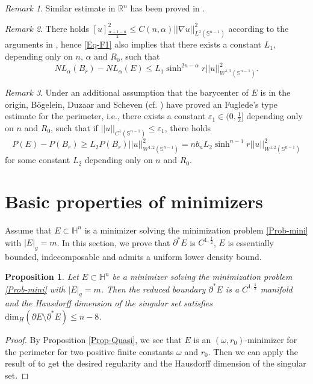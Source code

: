 \documentclass[11pt,reqno]{amsart}
\newtheorem{prop}[thm]{Proposition}
\theoremstyle{definition}
\theoremstyle{remark}
\newtheorem{rem}{Remark}
\numberwithin{equation}{section}
\renewcommand{\(}{\left(}
\renewcommand{\)}{\right)}
\renewcommand{\-}{\overline}
\begin{document}
\begin{rem}
	Similar estimate in $\mathbb{R}^n$ has been proved in \cite[Lemma 5.3]{Figalli15}.
\end{rem}
\begin{rem}\label{Rem-R1}
	There holds $[u]^2_{\frac{\alpha+1-n}{2}}\leq C(n,\alpha) ||\nabla u||^2_{L^2(\mathbb{S}^{n-1})}$ according to the arguments in \cite[Pages 486-490]{Figalli15}, hence \eqref{Eq-F1} also implies that there exists a constant $L_1$, depending only on $n$, $\alpha$ and $R_0$, such that
	\begin{equation}\label{Eq-F2}
			NL_{\alpha}(B_r)-NL_{\alpha}(E)\leq L_1 \sinh^{2n-\alpha} r||u||^2_{W^{1,2}(\mathbb{S}^{n-1})}.
	\end{equation}
\end{rem}
\begin{rem}\label{Rem-Fuglede}
	Under an additional assumption that the barycenter of $E$ is in the origin, Bögelein, Duzaar and Scheven (cf. \cite[Theorem 4.1]{Bogelein15}) have proved an Fuglede's type estimate for the perimeter, i.e., there exists a constant $\varepsilon_1\in(0,\frac{1}{2}]$ depending only on $n$ and $R_0$, such that if $||u||_{C^1(\mathbb{S}^{n-1})}\leq\varepsilon_1$, there holds
	\begin{equation}
		P(E)-P(B_r)\geq L_2P(B_r)||u||^2_{W^{1,2}(\mathbb{S}^{n-1})}=nb_nL_2\sinh^{n-1}r||u||^2_{W^{1,2}(\mathbb{S}^{n-1})}
	\end{equation}
for some constant $L_2$ depending only on $n$ and $R_0$.
\end{rem}
\section{Basic properties of minimizers}\label{Sec-Basic es}
Assume that $E\subset\mathbb{H}^n$ is a minimizer solving the minimization problem \eqref{Prob-mini} with $|E|_g=m$. In this section, we prove that $\partial^{*} E$ is $C^{1,\frac{1}{2}}$, $E$ is essentially bounded, indecomposable and admits a uniform lower density bound.
\begin{prop}
	Let $E\subset\mathbb{H}^n$ be a minimizer solving the minimization problem \eqref{Prob-mini} with $|E|_g=m$. Then the reduced boundary $\partial^{*}E$ is a $C^{1,\frac{1}{2}}$ manifold and the Hausdorff dimension of the singular set satisfies $\text{dim}_H(\partial E\setminus\partial^{*}E)\leq n-8$.
\end{prop}
\begin{proof}
	By Proposition \ref{Prop-Quasi}, we see that $E$ is an $(\omega, r_0)$-minimizer for the perimeter for two positive finite constants $\omega$ and $r_0$. Then we can apply the result of \cite[Thorem 1]{Tamanini82} to get the desired regularity and the Hausdorff dimension of the singular set.
\end{proof}
\end{document}
